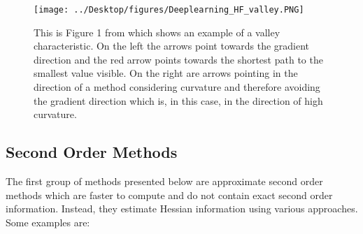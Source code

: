\documentclass[letterpaper,12pt,titlepage,oneside,final]{book}
\begin{document}
	\begin{figure}[h]
		\centering
		\texttt{[image: ../Desktop/figures/Deeplearning\_HF\_valley.PNG]}
		\caption{This is Figure 1 from \cite{martens2010deep} which shows an example of a valley characteristic. On the left the arrows point towards the gradient direction and the red arrow points towards the shortest path to the smallest value visible. On the right are arrows pointing in the direction of a method considering curvature and therefore avoiding the gradient direction which is, in this case, in the direction of high curvature.}
		\label{figure:valley}
	\end{figure}
	
	\subsection{Second Order Methods} \label{section:second_order}
	
	The first group of methods presented below are approximate second order methods which are faster to compute and do not contain exact second order information. Instead, they estimate Hessian information using various approaches. Some examples are:
	
\end{document}
